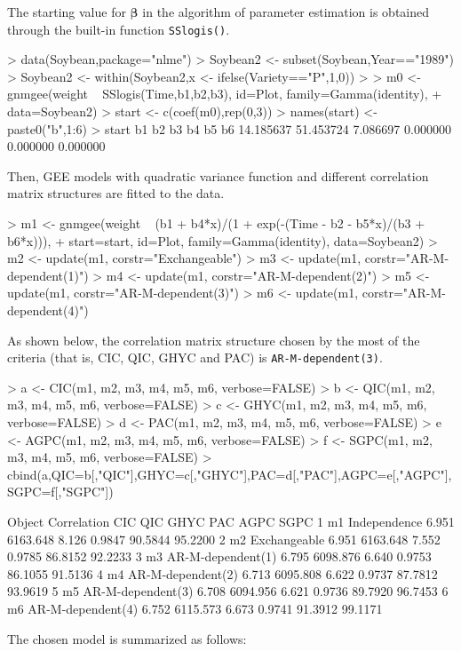 The starting value for $\bm{\beta}$ in the algorithm of parameter estimation is obtained through the built-in function {\tt SSlogis()}.
\begin{example}
> data(Soybean,package="nlme")
> Soybean2 <- subset(Soybean,Year=="1989")
> Soybean2 <- within(Soybean2,x <- ifelse(Variety=="P",1,0))
> 
> m0 <- gnmgee(weight ~ SSlogis(Time,b1,b2,b3), id=Plot, family=Gamma(identity), 
+              data=Soybean2)
> start <- c(coef(m0),rep(0,3))
> names(start) <- paste0("b",1:6)
> start
       b1        b2        b3        b4        b5        b6 
14.185637 51.453724  7.086697  0.000000  0.000000  0.000000 
\end{example}
Then, GEE models with quadratic variance function and different correlation matrix structures are fitted to the data.

\begin{example}
> m1 <- gnmgee(weight ~ (b1 + b4*x)/(1 + exp(-(Time - b2 - b5*x)/(b3 + b6*x))), 
+              start=start, id=Plot, family=Gamma(identity), data=Soybean2)
> m2 <- update(m1, corstr="Exchangeable")
> m3 <- update(m1, corstr="AR-M-dependent(1)")
> m4 <- update(m1, corstr="AR-M-dependent(2)")
> m5 <- update(m1, corstr="AR-M-dependent(3)")
> m6 <- update(m1, corstr="AR-M-dependent(4)")
\end{example}
As shown below, the correlation matrix structure chosen by the most of the criteria (that is, CIC, QIC, GHYC and PAC) is {\tt AR-M-dependent(3)}.

\begin{example}
> a <- CIC(m1, m2, m3, m4, m5, m6, verbose=FALSE)
> b <- QIC(m1, m2, m3, m4, m5, m6, verbose=FALSE)
> c <- GHYC(m1, m2, m3, m4, m5, m6, verbose=FALSE)
> d <- PAC(m1, m2, m3, m4, m5, m6, verbose=FALSE)
> e <- AGPC(m1, m2, m3, m4, m5, m6, verbose=FALSE)
> f <- SGPC(m1, m2, m3, m4, m5, m6, verbose=FALSE)
> cbind(a,QIC=b[,"QIC"],GHYC=c[,"GHYC"],PAC=d[,"PAC"],AGPC=e[,"AGPC"],SGPC=f[,"SGPC"])

  Object       Correlation   CIC      QIC  GHYC    PAC    AGPC    SGPC
1     m1      Independence 6.951 6163.648 8.126 0.9847 90.5844 95.2200
2     m2      Exchangeable 6.951 6163.648 7.552 0.9785 86.8152 92.2233
3     m3 AR-M-dependent(1) 6.795 6098.876 6.640 0.9753 86.1055 91.5136
4     m4 AR-M-dependent(2) 6.713 6095.808 6.622 0.9737 87.7812 93.9619
5     m5 AR-M-dependent(3) 6.708 6094.956 6.621 0.9736 89.7920 96.7453
6     m6 AR-M-dependent(4) 6.752 6115.573 6.673 0.9741 91.3912 99.1171
\end{example}
The chosen model is summarized as follows:

